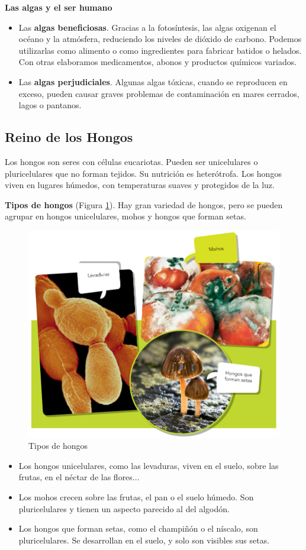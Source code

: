 \begin{itemize}
    \textbf{Las algas y el ser humano}
    \begin{itemize}
        \item Las \textbf{algas beneficiosas}. Gracias a la fotosíntesis, las algas oxigenan el océano y la atmósfera, reduciendo los niveles de dióxido de carbono. Podemos utilizarlas como alimento o como ingredientes para fabricar batidos o helados. Con otras elaboramos medicamentos, abonos y productos químicos variados.
        \item Las \textbf{algas perjudiciales}. Algunas algas tóxicas, cuando se reproducen en exceso, pueden causar graves problemas de contaminación en mares cerrados, lagos o pantanos.
    \end{itemize}
\end{itemize}

\subsection{Reino de los Hongos}

Los hongos son seres con células eucariotas. Pueden ser unicelulares o pluricelulares que no forman tejidos. Su nutrición es heterótrofa. Los hongos viven en lugares húmedos, con temperaturas suaves y protegidos de la luz.

\vspace{3mm}
\textbf{Tipos de hongos} (Figura \ref{fig:tipos-hongos}). Hay gran variedad de hongos, pero se pueden agrupar en hongos unicelulares, mohos y hongos que forman setas.

\begin{figure}[!ht]
    \centering
    \includegraphics[width=0.6\linewidth]{Tema1/12_Tipos_hongos.png}
    \caption{Tipos de hongos}
    \label{fig:tipos-hongos}
\end{figure}
\begin{itemize}
    \item Los hongos unicelulares, como las levaduras, viven en el suelo, sobre las frutas, en el néctar de las flores...
    \item Los mohos crecen sobre las frutas, el pan o el suelo húmedo. Son pluricelulares y tienen un aspecto parecido al del algodón.
    \item Los hongos que forman setas, como el champiñón o el níscalo, son pluricelulares. Se desarrollan en el suelo, y solo son visibles sus setas.
\end{itemize}

